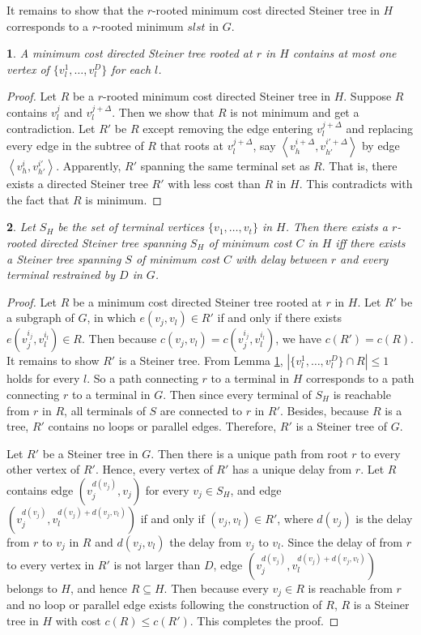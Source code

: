 \documentclass[english,runningheads,a4paper]{llncs}
\newtheorem{thm}{\protect\theoremname}
\newtheorem{lem}[thm]{\protect\lemmaname}
\providecommand{\lemmaname}{Lemma}
\providecommand{\theoremname}{Theorem}
\begin{document}
It remains to show that the $r$-rooted minimum cost directed Steiner
tree in $H$ corresponds to a $r$-rooted minimum $slst$ in $G$.
\begin{lem}
\label{lem:degree}A minimum cost directed Steiner tree rooted at
$r$ in $H$ contains at most one vertex of $\{v_{l}^{1},\dots,v_{l}^{D}\}$
for each $l$.\end{lem}
\begin{proof}
Let $R$ be a $r$-rooted minimum cost directed Steiner tree in $H$.
Suppose $R$ contains $v_{l}^{j}$ and $v_{l}^{j+\Delta}$. Then we
show that $R$ is not minimum and get a contradiction. Let $R'$ be
$R$ except removing the edge entering $v_{l}^{j+\Delta}$ and replacing
every edge in the subtree of $R$ that roots at $v_{l}^{j+\Delta}$,
say $\left\langle v_{h}^{i+\Delta},v_{h'}^{i'+\Delta}\right\rangle $
by edge $\left\langle v_{h}^{i},v_{h'}^{i'}\right\rangle $. Apparently,
$R'$ spanning the same terminal set as $R$. That is, there exists
a directed Steiner tree $R'$ with less cost than $R$ in $H$. This
contradicts with the fact that $R$ is minimum.\end{proof}
\begin{thm}
\label{thm:acyclic}Let $S_{H}$ be the set of terminal vertices $\{v_{1},\dots,v_{t}\}$
in $H$. Then there exists a $r$-rooted directed Steiner tree spanning
$S_{H}$ of minimum cost $C$ in $H$ iff there exists a Steiner tree
spanning $S$ of minimum cost $C$ with delay between $r$ and every
terminal restrained by $D$ in $G$.\end{thm}
\begin{proof}
Let $R$ be a minimum cost directed Steiner tree rooted at $r$ in
$H$. Let $R'$ be a subgraph of $G$, in which $e(v_{j},v_{l})\in R'$
if and only if there exists $e(v_{j}^{i_{j}},v_{l}^{i_{l}})\in R$.
Then because $c(v_{j},v_{l})=c(v_{j}^{i_{j}},v_{l}^{i_{l}})$, we
have $c(R')=c(R)$. It remains to show $R'$ is a Steiner tree. From
Lemma \ref{lem:degree}, $|\{v_{l}^{1},\dots,v_{l}^{D}\}\cap R|\leq1$
holds for every $l$. So a path connecting $r$ to a terminal in $H$
corresponds to a path connecting $r$ to a terminal in $G$.  Then
since every terminal of $S_{H}$ is reachable from $r$ in $R$, all
terminals of $S$ are connected to $r$ in $R'$. Besides, because
$R$ is a tree, $R'$ contains no loops or parallel edges. Therefore,
$R'$ is a Steiner tree of $G$.

Let $R'$ be a Steiner tree in $G$. Then there is a unique path from
root $r$ to every other vertex of $R'$. Hence, every vertex of $R'$
has a unique delay from $r$. Let $R$ contains edge $(v_{j}^{d(v_{j})},v_{j})$
for every $v_{j}\in S_{H}$, and edge $(v_{j}^{d(v_{j})},v_{l}^{d(v_{j})+d(v_{j},v_{l})})$
if and only if $(v_{j},v_{l})\in R'$, where $d(v_{j})$ is the delay
from $r$ to $v_{j}$ in $R$ and $d(v_{j},v_{l})$ the delay from
$v_{j}$ to $v_{l}$. Since the delay of from $r$ to every vertex
in $R'$ is not larger than $D$, edge $(v_{j}^{d(v_{j})},v_{l}^{d(v_{j})+d(v_{j},v_{l})})$
belongs to $H$, and hence $R\subseteq H$. Then because every $v_{j}\in R$
is reachable from $r$ and no loop or parallel edge exists following
the construction of $R$, $R$ is a Steiner tree in $H$ with cost
$c(R)\leq c(R')$. This completes the proof.
\end{proof}
\end{document}
